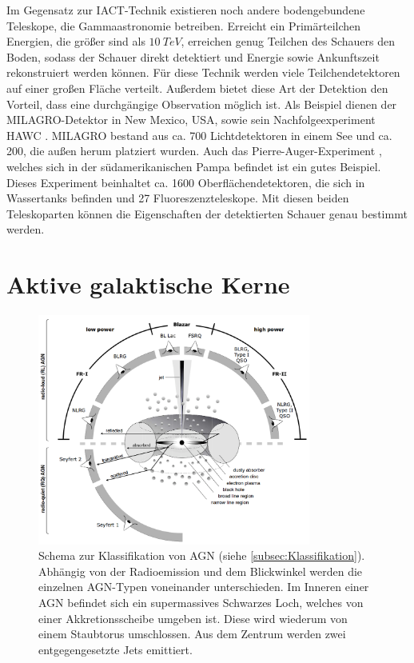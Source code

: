 Im Gegensatz zur IACT-Technik existieren noch andere bodengebundene Teleskope, die Gammaastronomie betreiben.
Erreicht ein Primärteilchen Energien, die größer sind als $\SI{10}{TeV}$, erreichen genug Teilchen des Schauers den Boden, sodass der Schauer direkt detektiert und Energie sowie Ankunftszeit rekonstruiert werden können.
Für diese Technik werden viele Teilchendetektoren auf einer großen Fläche verteilt.
Außerdem bietet diese Art der Detektion den Vorteil, dass eine durchgängige Observation möglich ist.
Als Beispiel dienen der MILAGRO-Detektor \cite{MILAGRO} in New Mexico, USA, sowie sein Nachfolgeexperiment HAWC \cite{HAWC}.
MILAGRO bestand aus ca. 700 Lichtdetektoren in einem See und ca. 200, die außen herum platziert wurden.
Auch das Pierre-Auger-Experiment \cite{AUGER}, welches sich in der südamerikanischen Pampa befindet ist ein gutes Beispiel.
Dieses Experiment beinhaltet ca. 1600 Oberflächendetektoren, die sich in Wassertanks befinden und 27 Fluoreszenzteleskope.
Mit diesen beiden Teleskoparten können die Eigenschaften der detektierten Schauer genau bestimmt werden.



\section{Aktive galaktische Kerne}
\label{sec:AGN}

\begin{figure}
    \centering
    \includegraphics[width=0.8\textwidth]{./Plots/02_Astroteilchenphysik/AGN_Schema.png}
    \caption{Schema zur Klassifikation von AGN (siehe \autoref{subsec:Klassifikation}). Abhängig von der Radioemission und dem Blickwinkel werden die einzelnen AGN-Typen voneinander unterschieden.
    Im Inneren einer AGN befindet sich ein supermassives Schwarzes Loch, welches von einer Akkretionsscheibe umgeben ist. 
    Diese wird wiederum von einem Staubtorus umschlossen.
    Aus dem Zentrum werden zwei entgegengesetzte Jets emittiert.\cite{AGNSchema}}
    \label{AGN_Bild}
\end{figure}

